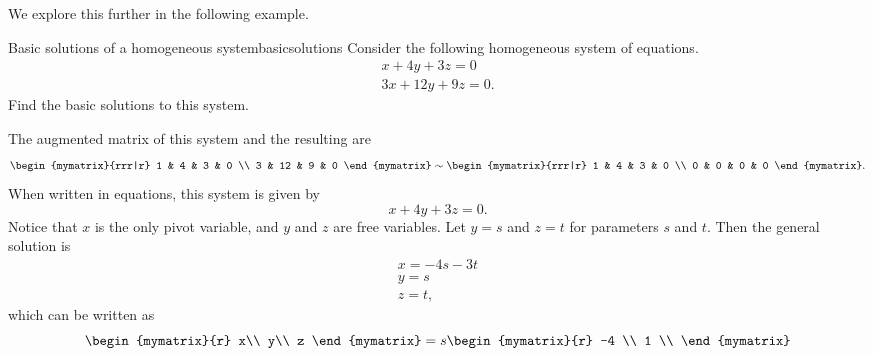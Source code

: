 We explore this further in the following example.

\begin{example}{Basic solutions of a homogeneous system}{basicsolutions}
  Consider the following homogeneous system of equations. 
  \begin{equation}\label{eqn:basicsolutions-1}
    \begin{array}{c}
      x + 4y + 3z = 0 \\
      3x + 12y + 9z = 0.
    \end{array}
  \end{equation}
  Find the basic solutions to this system.
\end{example}

\begin{solution}
  The augmented matrix of this system and the resulting {\rref} are 
  \begin{equation*}
    \begin{mymatrix}{rrr|r}
      1 & 4 & 3 & 0 \\
      3 & 12 & 9 & 0
    \end{mymatrix}
    \sim
    \begin{mymatrix}{rrr|r}
      1 & 4 & 3 & 0 \\
      0 & 0 & 0 & 0
    \end{mymatrix}.
  \end{equation*}
  When written in equations, this system is given by 
  \begin{equation*}
    x + 4y +3z=0.
  \end{equation*}
  Notice that $x$ is the only pivot variable, and $y$ and $z$ are free
  variables. Let $y = s$ and $z=t$ for parameters $s$ and $t$. Then the
  general solution is
  \begin{equation*}
    \begin{array}{c}
      x = -4s - 3t \\
      y = s \\
      z = t,
    \end{array}
  \end{equation*}
  which can be written as 
  \begin{equation*}
    \begin{mymatrix}{r}
      x\\
      y\\
      z
    \end{mymatrix}
    =
    s
    \begin{mymatrix}{r}
      -4 \\
      1 \\

\end{mymatrix}
\end{equation*}
\end{solution}
